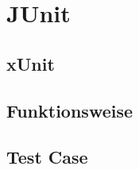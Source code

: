%
%
\chapter{JUnit}\label{ch:junit}
	\section{xUnit}\label{s:xunit}
	\section{Funktionsweise}\label{s:funktionsweise}
	\section{Test Case}\label{s:testcase}
